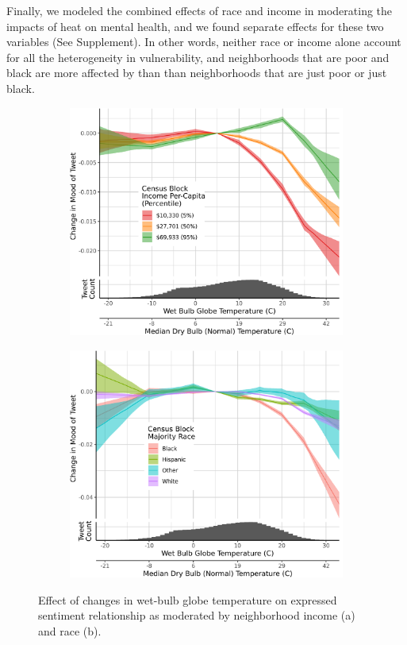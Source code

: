 \documentclass{article}
\begin{document}
Finally, we modeled the combined effects of race and income in moderating the impacts of heat on mental health, and we found separate effects for these two variables (See Supplement).  In other words, neither race or income alone account for all the heterogeneity in vulnerability, and neighborhoods that are poor and black are more affected by than than neighborhoods that are just poor or just black.

\begin{figure}[H]
\centering
\begin{subfigure}{.5\textwidth}
  \centering
  \includegraphics[width=\linewidth]{../res/wbgt-income.png}
  \caption{}
  \label{fig:sub1}
\end{subfigure}%
\begin{subfigure}{.5\textwidth}
  \centering
  \includegraphics[width=\linewidth]{../res/wbgt-race_q.png}
  \caption{}
  \label{fig:sub2}
\end{subfigure}
\caption{Effect of changes in wet-bulb globe temperature on expressed sentiment relationship as moderated by neighborhood income (a) and race (b).}
\label{fig:test}
\end{figure}
\end{document}
